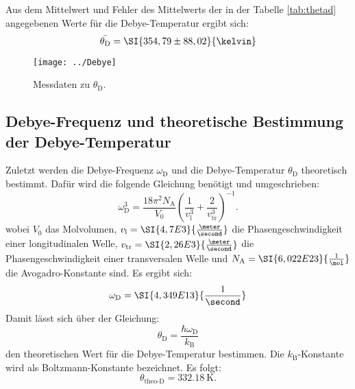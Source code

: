 Aus dem Mittelwert und Fehler des Mittelwerts der in der Tabelle \ref{tab:thetad} angegebenen Werte für die Debye-Temperatur ergibt sich:
\begin{equation*}
\bar{\theta_\text{D}}= \SI{354,79 \pm 88,02}{\kelvin}
\end{equation*} 

\begin{figure}[h!]
	\centering
	\texttt{[image: ../Debye]}
	\caption{Messdaten zu $\theta_\text{D}$.}
	\label{fig:debye}
\end{figure}
\FloatBarrier

\subsection{Debye-Frequenz und theoretische Bestimmung der Debye-Temperatur}
Zuletzt werden die Debye-Frequenz $\omega_\text{D}$ und die Debye-Temperatur $\theta_\text{D}$ theoretisch bestimmt. Dafür wird die folgende Gleichung benötigt und umgeschrieben:
\begin{equation}
\omega_\text{D}^3=\frac{18\pi^2N_\text{A}}{V_0}\left(\frac{1}{v_\text{l}^3}+\frac{2}{v_\text{tr}^3}\right)^{-1}. \label{eqn:omegad}
\end{equation}
wobei $V_0$ das Molvolumen, $v_\text{l} = \SI{4,7E3}{\frac{\meter}{\second}}$ \cite[5]{anleitungV47} die Phasengeschwindigkeit einer longitudinalen Welle, $v_\text{tr} = \SI{2,26E3}{\frac{\meter}{\second}}$ \cite[5]{anleitungV47} die Phasengeschwindigkeit einer transversalen Welle und $N_\text{A} = \SI{6,022E23}{\frac{1}{\mol}}$ die Avogadro-Konstante \cite{AvogradoKonstante} sind. Es ergibt sich:
\begin{equation*}
\omega_\text{D} = \SI{4,349E13}{\frac{1}{\second}}
\end{equation*}
Damit lässt sich über der Gleichung:
\begin{equation}
\theta_\text{D} = \frac{\hbar \omega_\text{D}}{k_\text{B}}
\end{equation}
den theoretischen Wert für die Debye-Temperatur bestimmen. Die $k_\text{B}$-Konstante wird als Boltzmann-Konstante \cite{BoltzmannKonstante} bezeichnet. Es folgt:
\begin{equation*}
\theta_\text{theo-D} = \SI{332,18}{\kelvin}.
\end{equation*}
